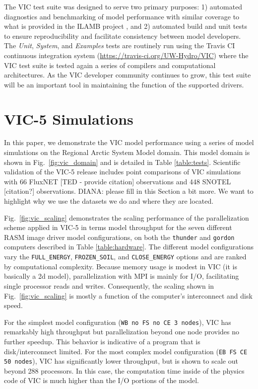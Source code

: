 \documentclass[gmd, manuscript]{copernicus}
\begin{document}
    The VIC test suite was designed to serve two primary purposes: 1) automated diagnostics and benchmarking of model performance with similar coverage to what is provided in the ILAMB project \citep{Luo_2012}, and 2) automated build and unit tests to ensure reproducibility and facilitate consistency between model developers. The \textit{Unit}, \textit{System}, and \textit{Examples} tests are routinely run using the Travis CI continuous integration system (\url{https://travis-ci.org/UW-Hydro/VIC}) where the VIC test suite is tested again a series of compilers and computational architectures. As the VIC developer community continues to grow, this test suite will be an important tool in maintaining the function of the supported drivers.

  \section{VIC-5 Simulations}
    \label{sec:vic-5_simulations}
    In this paper, we demonstrate the VIC model performance using a series of model simulations on the Regional Arctic System Model domain. This model domain is shown in Fig.~\ref{fig:vic_domain} and is detailed in Table \ref{table:tests}. Scientific validation of the VIC-5 release includes point comparisons of VIC simulations with 66 FluxNET [TED - provide citation] observations and 448 SNOTEL [citation?] observations.
    DIANA: please fill in this Section a bit more. We want to highlight why we use the datasets we do and where they are located.

    Fig.~\ref{fig:vic_scaling} demonstrates the scaling performance of the parallelization scheme applied in VIC-5 in terms model throughput for the seven different RASM image driver model configurations, on both the \verb|thunder| and \verb|gordon| computers described in Table \ref{table:hardware}. The different model configurations vary the \verb|FULL_ENERGY|, \verb|FROZEN_SOIL|, and \verb|CLOSE_ENERGY| options and are ranked by computational complexity. Because memory usage is modest in VIC (it is basically a 2d model), parallelization with MPI is mainly for I/O, facilitating single processor reads and writes. Consequently, the scaling shown in Fig.~\ref{fig:vic_scaling} is mostly a function of the computer's interconnect and disk speed.

    For the simplest model configuration (\verb|WB no FS no CE 3 nodes|), VIC has remarkably high throughput but parallelization beyond one node provides no further speedup. This behavior is indicative of a program that is disk/interconnect limited. For the most complex model configuration (\verb|EB FS CE 50 nodes|), VIC has significantly lower throughput, but is shown to scale out beyond 288 processors. In this case, the computation time inside of the physics code of VIC is much higher than the I/O portions of the model.
\end{document}
